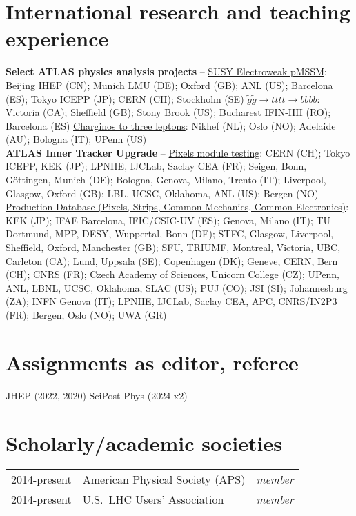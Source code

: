 \vspace{-2.0em}\section{International research and teaching experience} \label{sec:international-research-and-teaching-experience}
{
\footnotesize
\textbf{Select ATLAS physics analysis projects} -- \ul{SUSY Electroweak pMSSM}: Beijing IHEP (CN); Munich LMU (DE); Oxford (GB); ANL (US); Barcelona (ES); Tokyo ICEPP (JP); CERN (CH); Stockholm (SE) {\color{red!75!black!50}\large\rmfamily\textbullet} \ul{$\tilde{g}\tilde{g}\to tttt \to bbbb$}: Victoria (CA); Sheffield (GB); Stony Brook (US); Bucharest IFIN-HH (RO); Barcelona (ES) {\color{red!75!black!50}\large\rmfamily\textbullet} \ul{Charginos to three leptons}: Nikhef (NL); Oslo (NO); Adelaide (AU); Bologna (IT); UPenn (US) \\
\textbf{ATLAS Inner Tracker Upgrade} -- \ul{Pixels module testing}:  CERN (CH); Tokyo ICEPP, KEK (JP); LPNHE, IJCLab, Saclay CEA (FR); Seigen, Bonn, G\"{o}ttingen, Munich (DE); Bologna, Genova, Milano, Trento (IT); Liverpool, Glasgow, Oxford (GB); LBL, UCSC, Oklahoma, ANL (US); Bergen (NO) {\color{red!75!black!50}\large\rmfamily\textbullet} \ul{Production Database (Pixels, Strips, Common Mechanics, Common Electronics)}: KEK (JP); IFAE Barcelona, IFIC/CSIC-UV (ES); Genova, Milano (IT); TU Dortmund, MPP, DESY, Wuppertal, Bonn (DE); STFC, Glasgow, Liverpool, Sheffield, Oxford, Manchester (GB); SFU, TRIUMF, Montreal, Victoria, UBC, Carleton (CA); Lund, Uppsala (SE); Copenhagen (DK); Geneve, CERN, Bern (CH); CNRS (FR); Czech Academy of Sciences, Unicorn College (CZ); UPenn, ANL, LBNL, UCSC, Oklahoma, SLAC (US); PUJ (CO); JSI (SI); Johannesburg (ZA); INFN Genova (IT); LPNHE, IJCLab, Saclay CEA, APC, CNRS/IN2P3 (FR); Bergen, Oslo (NO); UWA (GR)
}

\vspace{-2.0em}\section{Assignments as editor, referee} \label{sec:assignments-as-editor-referee}
{
	\footnotesize
	JHEP (2022, 2020) {\color{red!75!black!50}\large\rmfamily\textbullet} SciPost Phys (2024 x2)
}

\vspace{-2.0em}\section{Scholarly/academic societies} \label{sec:scholarly-academic-societies}
\begin{tabular}{r|ll}
	2014-present & American Physical Society (APS) & \textit{member} \\
	2014-present & U.S.~LHC Users' Association     & \textit{member} \\
\end{tabular}

